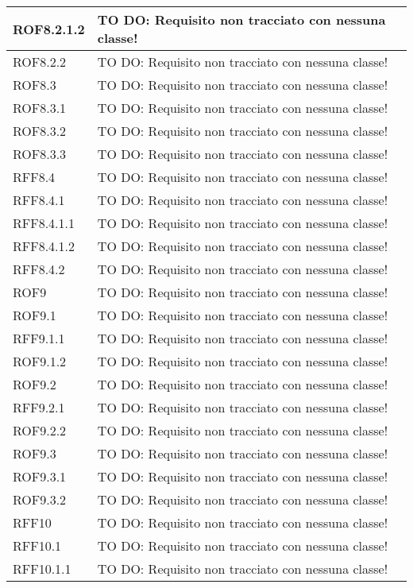 \begin{center}
\begin{longtable}{| p{4cm} | p{8cm} |}
ROF8.2.1.2 & TO DO: Requisito non tracciato con nessuna classe! \\
\hline
ROF8.2.2 & TO DO: Requisito non tracciato con nessuna classe! \\
\hline
ROF8.3 & TO DO: Requisito non tracciato con nessuna classe! \\
\hline
ROF8.3.1 & TO DO: Requisito non tracciato con nessuna classe! \\
\hline
ROF8.3.2 & TO DO: Requisito non tracciato con nessuna classe! \\
\hline
ROF8.3.3 & TO DO: Requisito non tracciato con nessuna classe! \\
\hline
RFF8.4 & TO DO: Requisito non tracciato con nessuna classe! \\
\hline
RFF8.4.1 & TO DO: Requisito non tracciato con nessuna classe! \\
\hline
RFF8.4.1.1 & TO DO: Requisito non tracciato con nessuna classe! \\
\hline
RFF8.4.1.2 & TO DO: Requisito non tracciato con nessuna classe! \\
\hline
RFF8.4.2 & TO DO: Requisito non tracciato con nessuna classe! \\
\hline
ROF9 & TO DO: Requisito non tracciato con nessuna classe! \\
\hline
ROF9.1 & TO DO: Requisito non tracciato con nessuna classe! \\
\hline
RFF9.1.1 & TO DO: Requisito non tracciato con nessuna classe! \\
\hline
ROF9.1.2 & TO DO: Requisito non tracciato con nessuna classe! \\
\hline
ROF9.2 & TO DO: Requisito non tracciato con nessuna classe! \\
\hline
RFF9.2.1 & TO DO: Requisito non tracciato con nessuna classe! \\
\hline
ROF9.2.2 & TO DO: Requisito non tracciato con nessuna classe! \\
\hline
ROF9.3 & TO DO: Requisito non tracciato con nessuna classe! \\
\hline
ROF9.3.1 & TO DO: Requisito non tracciato con nessuna classe! \\
\hline
ROF9.3.2 & TO DO: Requisito non tracciato con nessuna classe! \\
\hline
RFF10 & TO DO: Requisito non tracciato con nessuna classe! \\
\hline
RFF10.1 & TO DO: Requisito non tracciato con nessuna classe! \\
\hline
RFF10.1.1 & TO DO: Requisito non tracciato con nessuna classe! \\

\end{longtable}
\end{center}
